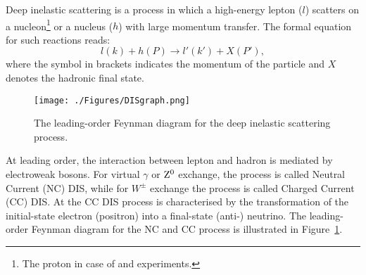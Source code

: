 Deep inelastic scattering is a process in which a high-energy lepton ($l$) scatters on a nucleon\footnote{The proton in case of \hone and \zeus experiments.} or a nucleus ($h$) with large momentum transfer. The formal equation for such reactions reads:
\begin{equation}
l\left( k \right) + h\left( P \right) \rightarrow l'\left( k' \right) + X\left( P' \right),
\label{eq:DISreactions}
\end{equation}
where the symbol in brackets indicates the momentum of the particle and $X$ denotes the hadronic final state.
\begin{figure}
	\centering
		\texttt{[image: ./Figures/DISgraph.png]}
	\caption{The leading-order Feynman diagram for the deep inelastic scattering process.}
	\label{fig:DISgraph}
\end{figure}
At leading order, the interaction between lepton and hadron is mediated by electroweak bosons. For virtual $\gamma$ or $\mbox{$\rm{Z}^0$}$ exchange, the process is called Neutral Current (NC) DIS, while for $W^\pm$ exchange the process is called Charged Current (CC) DIS. At \hera the CC DIS process is characterised by the transformation of the initial-state electron (positron) into a final-state (anti-) neutrino. The leading-order Feynman diagram for the NC and CC process is illustrated in Figure~\ref{fig:DISgraph}.


